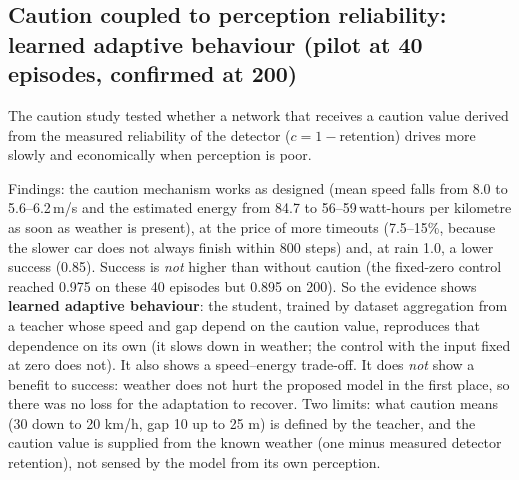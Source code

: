 \subsection{Caution coupled to perception reliability: learned adaptive behaviour (pilot at 40 episodes, confirmed at 200)}
The caution study tested whether a network that receives a caution value derived from the measured reliability of the detector ($c=1-\text{retention}$) drives more slowly and economically when perception is poor.
\begin{table}[H]\centering\small
\caption{Caution study, sparse traffic, seeds 1010--1049 (40 episodes per cell, pilot).}\label{tab:caution}
\resizebox{\textwidth}{!}{}
\end{table}
Findings: the caution mechanism works as designed (mean speed falls from 8.0 to 5.6--6.2\,m/s and the estimated energy from 84.7 to 56--59\,watt-hours per kilometre as soon as weather is present), at the price of more timeouts (7.5--15\%, because the slower car does not always finish within 800 steps) and, at rain 1.0, a lower success (0.85).
Success is \emph{not} higher than without caution (the fixed-zero control reached 0.975 on these 40 episodes but 0.895 on 200). So the evidence shows \textbf{learned adaptive behaviour}: the student, trained by dataset aggregation from a teacher whose speed and gap depend on the caution value, reproduces that dependence on its own (it slows down in weather; the control with the input fixed at zero does not). It also shows a speed--energy trade-off. It does \emph{not} show a benefit to success: weather does not hurt the proposed model in the first place, so there was no loss for the adaptation to recover. Two limits: what caution means (30 down to 20 km/h, gap 10 up to 25 m) is defined by the teacher, and the caution value is supplied from the known weather (one minus measured detector retention), not sensed by the model from its own perception.

